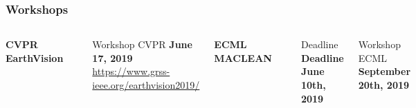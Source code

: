 \documentclass[%
  aspectratio=169,
  9pt,
  USenglish,
  titlegraphic, %
  affiliationintitlepagehead,
  affiliation,
]{beamer}
\begin{document}
\begin{frame}[t]
	\frametitle{Workshops}
	
	\begin{columns}[t]
		
		\textbf{CVPR EarthVision}
		\vspace{1em}
		
		\includegraphics[width=\textwidth]{images/EarthVision}
		
		Workshop CVPR \textbf{June 17, 2019}
		\url{https://www.grss-ieee.org/earthvision2019/}
		
		\textbf{ECML MACLEAN}
		\vspace{1em}
	
		\includegraphics[width=\textwidth]{images/maclean-1-768x245}
		
		\vspace{3em}
		
		Deadline \textbf{Deadline June 10th, 2019}
		
		Workshop ECML \textbf{September 20th, 2019}
		
	
	\end{columns}
\end{frame}

%	
%	
\end{document}
